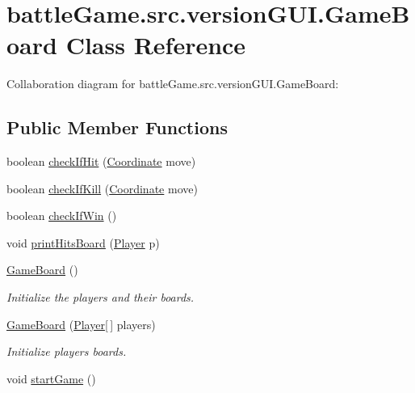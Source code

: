 \hypertarget{classbattleGame_1_1src_1_1versionGUI_1_1GameBoard}{}\section{battle\+Game.\+src.\+version\+G\+U\+I.\+Game\+Board Class Reference}
\label{classbattleGame_1_1src_1_1versionGUI_1_1GameBoard}


Collaboration diagram for battle\+Game.\+src.\+version\+G\+U\+I.\+Game\+Board\+:
\subsection*{Public Member Functions}
\begin{DoxyCompactItemize}
\item 
boolean \hyperlink{classbattleGame_1_1src_1_1versionGUI_1_1GameBoard_a0f1b7bd1c6e3eb605b7a2526b6b5fd3d}{check\+If\+Hit} (\hyperlink{classbattleGame_1_1src_1_1versionGUI_1_1Coordinate}{Coordinate} move)
\item 
boolean \hyperlink{classbattleGame_1_1src_1_1versionGUI_1_1GameBoard_a2e885cf7d91e7b04d7c6f5846f547ec2}{check\+If\+Kill} (\hyperlink{classbattleGame_1_1src_1_1versionGUI_1_1Coordinate}{Coordinate} move)
\item 
boolean \hyperlink{classbattleGame_1_1src_1_1versionGUI_1_1GameBoard_a613bc7dcb8f41d7a6568f8eb63ae9399}{check\+If\+Win} ()
\item 
void \hyperlink{classbattleGame_1_1src_1_1versionGUI_1_1GameBoard_ae6b4662d285099b485d76e2757e335f7}{print\+Hits\+Board} (\hyperlink{classbattleGame_1_1src_1_1versionGUI_1_1Player}{Player} p)
\item 
\hyperlink{classbattleGame_1_1src_1_1versionGUI_1_1GameBoard_ad3750e93f42feb60faa8028d7726d52b}{Game\+Board} ()
\begin{DoxyCompactList}\small\item\em Initialize the players and their boards. \end{DoxyCompactList}\item 
\hyperlink{classbattleGame_1_1src_1_1versionGUI_1_1GameBoard_a78a619348217b40a5445c3f00351503c}{Game\+Board} (\hyperlink{classbattleGame_1_1src_1_1versionGUI_1_1Player}{Player}\mbox{[}$\,$\mbox{]} players)
\begin{DoxyCompactList}\small\item\em Initialize players\textquotesingle{} boards. \end{DoxyCompactList}\item 
void \hyperlink{classbattleGame_1_1src_1_1versionGUI_1_1GameBoard_a451a1d2ab7c1f2216211239f28827f11}{start\+Game} ()
\end{DoxyCompactItemize}
